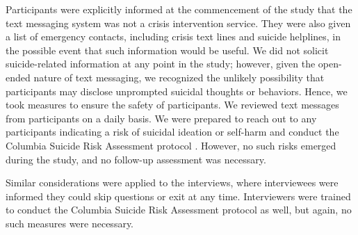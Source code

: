 Participants were explicitly informed at the commencement of the study that the text messaging system was not a crisis intervention service. They were also given a list of emergency contacts, including crisis text lines and suicide helplines, in the possible event that such information would be useful. We did not solicit suicide-related information at any point in the study; however, given the open-ended nature of text messaging, we recognized the unlikely possibility that participants may disclose unprompted suicidal thoughts or behaviors. Hence, we took measures to ensure the safety of participants. We reviewed text messages from participants on a daily basis. We were prepared to reach out to any participants indicating a risk of suicidal ideation or self-harm and conduct the Columbia Suicide Risk Assessment protocol \cite{posner2008columbia}. However, no such risks emerged during the study, and no follow-up assessment was necessary. 

Similar considerations were applied to the interviews, where interviewees were informed they could skip questions or exit at any time. Interviewers were trained to conduct the Columbia Suicide Risk Assessment protocol as well, but again, no such measures were necessary. 